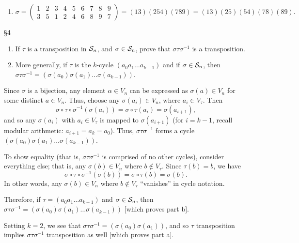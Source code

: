 \documentclass{homework}
\begin{document}
\begin{solution}
\begin{enumerate}[label=(\alph*)]
    \item \[
        \sigma= \begin{pmatrix} 1&2&3&4&5&6&7&8&9\\3&5&1&2&4&6&8&9&7
        \end{pmatrix}=(13)(254)(789)=(13)(25)(54)(78)(89)
    .\] 
  \end{enumerate}
\end{solution}

\begin{problem}{\S 4}
  \begin{enumerate}[label=(\alph*)]
    \item If $ \tau $ is a transposition in $ \mathcal{S}_n$, and $\sigma\in \mathcal{S}_n$, prove that
      $\sigma\tau\sigma^{-1}$ is a transposition.
    \item More generally, if $\tau$ is the $k$-cycle $(a_0a_1\ldots a_{k-1})$ and if $ \sigma\in
      \mathcal{S}_n$, then $ \sigma\tau\sigma^{-1}=(\sigma(a_0)\sigma(a_1)\ldots\sigma(a_{k-1}))$.
  \end{enumerate}
\end{problem}

\begin{solution}
  Since $\sigma$ is a bijection, any element $\alpha\in V_n$ can be expressed as $\sigma(a)\in V_n$
  for some distinct $a\in V_n$. Thus, choose any $\sigma(a_i)\in V_n$, where $a_i\in V_\tau$. Then
  \[
    \sigma\circ \tau\circ \sigma^{-1}(\sigma(a_i))=\sigma\circ \tau(a_i)=\sigma(a_{i+1})
  ,\] and so any $\sigma(a_i)$ with $a_i\in V_\tau$ is mapped to $\sigma(a_{i+1})$ (for $i=k-1$,
  recall modular arithmetic: $a_{i+1}=a_k=a_0$). Thus, $\sigma\tau\sigma^{-1}$ forms a cycle
  $(\sigma(a_0)\sigma(a_1)\ldots\sigma(a_{k-1}))$.

  To show equality (that is, $\sigma\tau\sigma^{-1}$ is comprised of no other cycles), consider
  everything else; that is, any $\sigma(b)\in V_n$ where $b\not\in V_\tau$. Since $\tau(b)=b$, we
  have \[
    \sigma\circ \tau\circ \sigma^{-1}(\sigma(b))=\sigma\circ \tau(b)=\sigma(b)
  .\] In other words, any $\sigma(b)\in V_n$ where $b\not\in V_\tau$ ``vanishes'' in cycle notation.

  Therefore, if $\tau=(a_0a_1\ldots a_{k-1})$ and $\sigma\in \mathcal{S}_n$, then
  $\sigma\tau\sigma^{-1}=(\sigma(a_0)\sigma(a_1)\ldots\sigma(a_{k-1}))$ [which proves part b].

  Setting $k=2$, we see that $\sigma\tau\sigma^{-1}=(\sigma(a_0)\sigma(a_1))$, and so $\tau$ 
  transposition implies $\sigma\tau\sigma^{-1}$ transposition as well [which proves part a].
\end{solution}
\end{document}
